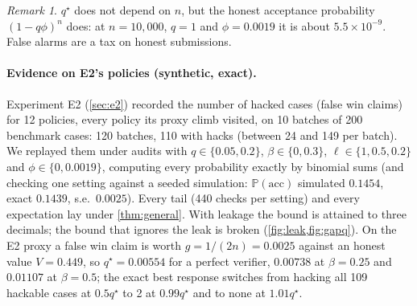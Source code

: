\documentclass[11pt]{article}
\theoremstyle{definition}
\theoremstyle{remark}
\newtheorem{remark}[theorem]{Remark}
\renewcommand{\P}{\mathbb{P}}
\newcommand{\1}{\mathbf{1}}
\begin{document}
\begin{remark}
$q^\star$ does not depend on $n$, but the honest acceptance probability $(1-q\phi)^n$ does: at $n=10{,}000$, $q=1$ and $\phi=0.0019$ it is about $5.5\times10^{-9}$. False alarms are a tax on honest submissions.
\end{remark}

\paragraph{Evidence on E2's policies (synthetic, exact).} Experiment E2 (\cref{sec:e2}) recorded the number of hacked cases (false win claims) for 12 policies, every policy its proxy climb visited, on 10 batches of 200 benchmark cases: 120 batches, 110 with hacks (between 24 and 149 per batch). We replayed them under audits with $q\in\{0.05,0.2\}$, $\beta\in\{0,0.3\}$, $\ell\in\{1,0.5,0.2\}$ and $\phi\in\{0,0.0019\}$, computing every probability exactly by binomial sums (and checking one setting against a seeded simulation: $\P(\text{acc})$ simulated $0.1454$, exact $0.1439$, s.e.\ $0.0025$). Every tail (440 checks per setting) and every expectation lay under \cref{thm:general}. With leakage the bound is attained to three decimals; the bound that ignores the leak is broken (\cref{fig:leak,fig:gapq}). On the E2 proxy a false win claim is worth $g=1/(2n)=0.0025$ against an honest value $V=0.449$, so $q^\star=0.00554$ for a perfect verifier, $0.00738$ at $\beta=0.25$ and $0.01107$ at $\beta=0.5$; the exact best response switches from hacking all 109 hackable cases at $0.5q^\star$ to 2 at $0.99q^\star$ and to none at $1.01q^\star$.
\end{document}
